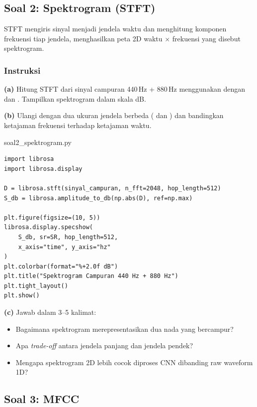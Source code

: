 \documentclass[12pt, a4paper]{article}
\begin{document}
\subsection{Soal 2: Spektrogram (STFT)}
\label{sec:soal2}

STFT mengiris sinyal menjadi jendela waktu dan menghitung komponen frekuensi tiap jendela, menghasilkan peta 2D waktu $\times$ frekuensi yang disebut spektrogram.

\subsubsection{Instruksi}
\label{sec:soal2-instruksi}

\textbf{(a)} Hitung STFT dari sinyal campuran 440\,Hz + 880\,Hz menggunakan  dengan  dan . Tampilkan spektrogram dalam skala dB.

\textbf{(b)} Ulangi dengan dua ukuran jendela berbeda ( dan ) dan bandingkan ketajaman frekuensi terhadap ketajaman waktu.

\begin{codewindow}{soal2\_spektrogram.py}
\begin{lstlisting}[style=pycode]
import librosa
import librosa.display

D = librosa.stft(sinyal_campuran, n_fft=2048, hop_length=512)
S_db = librosa.amplitude_to_db(np.abs(D), ref=np.max)

plt.figure(figsize=(10, 5))
librosa.display.specshow(
    S_db, sr=SR, hop_length=512,
    x_axis="time", y_axis="hz"
)
plt.colorbar(format="%+2.0f dB")
plt.title("Spektrogram Campuran 440 Hz + 880 Hz")
plt.tight_layout()
plt.show()
\end{lstlisting}
\end{codewindow}

\textbf{(c)} Jawab dalam 3--5 kalimat:
\begin{itemize}
  \item Bagaimana spektrogram merepresentasikan dua nada yang bercampur?
  \item Apa \emph{trade-off} antara jendela panjang dan jendela pendek?
  \item Mengapa spektrogram 2D lebih cocok diproses CNN dibanding raw waveform 1D?
\end{itemize}

\subsection{Soal 3: MFCC}
\label{sec:soal3}
\end{document}
